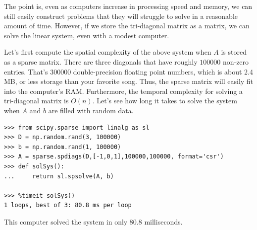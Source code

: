 The point is, even as computers increase in processing speed and memory, we can still easily construct problems that they will struggle to solve in a reasonable amount of time. However, if we store the tri-diagonal matrix as a  matrix, we can solve the linear system, even with a modest computer.  

Let's first compute the spatial complexity of the above system when $A$ is stored as a sparse matrix.  There are three diagonals that have roughly $100000$ non-zero entries.  That's $300000$
double-precision floating point numbers, which is about 2.4 MB, or less storage than your favorite song.  Thus, the sparse matrix will easily fit into the computer's RAM.  Furthermore, the temporal complexity for solving a tri-diagonal matrix is $O(n)$. Let's see how long it takes to solve the system when $A$ and $b$ are filled with random data.

\begin{lstlisting}
>>> from scipy.sparse import linalg as sl
>>> D = np.random.rand(3, 100000)
>>> b = np.random.rand(1, 100000)
>>> A = sparse.spdiags(D,[-1,0,1],100000,100000, format='csr')
>>> def solSys():
...     return sl.spsolve(A, b)

>>> %timeit solSys()
1 loops, best of 3: 80.8 ms per loop

\end{lstlisting}

This computer solved the system in only 80.8 milliseconds.

